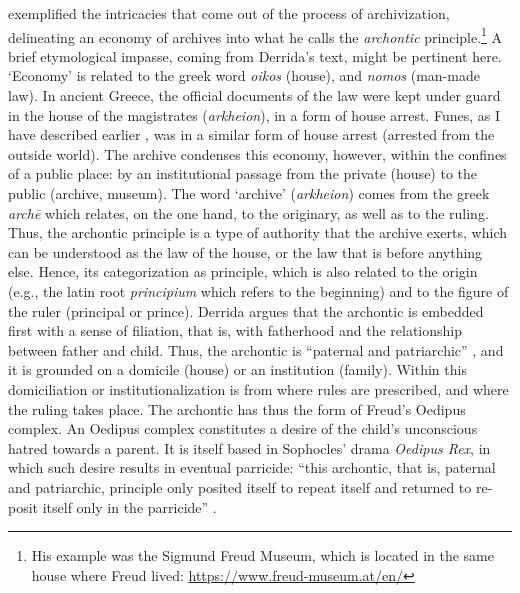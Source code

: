 \textcite{Der95:Arc} exemplified the intricacies that come out of the process of archivization, delineating an economy of archives into what he calls the \textit{archontic} principle.\footnote{His example was the Sigmund Freud Museum, which is located in the same house where Freud lived: \url{https://www.freud-museum.at/en/}} A brief etymological impasse, coming from Derrida's text, might be pertinent here. `Economy' is related to the greek word \textit{oikos} (house), and \textit{nomos} (man-made law). In ancient Greece, the official documents of the law were kept under guard in the house of the magistrates (\textit{arkheion}), in a form of house arrest. Funes, as I have described earlier , was in a similar form of house arrest (arrested from the outside world). The archive condenses this economy, however, within the confines of a public place: by an institutional passage from the private (house) to the public (archive, museum). The word `archive' (\textit{arkheion}) comes from the greek \textit{archē} which relates, on the one hand, to the originary, as well as to the ruling. Thus, the archontic principle is a type of authority that the archive exerts, which can be understood as the law of the house, or the law that is before anything else. Hence, its categorization as principle, which is also related to the origin (e.g., the latin root \textit{principium} which refers to the beginning) and to the figure of the ruler (principal or prince). Derrida argues that the archontic is embedded first with a sense of filiation, that is, with fatherhood and the relationship between father and child. Thus, the archontic is ``paternal and patriarchic'' \parencite[60]{Der95:Arc}, and it is grounded on a domicile (house) or an institution (family). Within this domiciliation or institutionalization is from where rules are prescribed, and where the ruling takes place. The archontic has thus the form of Freud's Oedipus complex. An Oedipus complex constitutes a desire of the child's unconscious hatred towards a parent. It is itself based in Sophocles' drama \textit{Oedipus Rex}, in which such desire results in eventual parricide: ``this archontic, that is, paternal and patriarchic, principle only posited itself to repeat itself and returned to re-posit itself only in the parricide'' \parencite[60]{Der95:Arc}.

